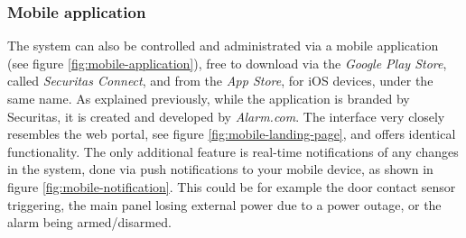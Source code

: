\subsubsection{Mobile application}
The system can also be controlled and administrated via a mobile application (see figure \ref{fig:mobile-application}), free to download via the \textit{Google Play Store}, called \textit{Securitas Connect}, and from the \textit{App Store}, for iOS devices, under the same name. As explained previously, while the application is branded by Securitas, it is created and developed by \textit{Alarm.com}. The interface very closely resembles the web portal, see figure \ref{fig:mobile-landing-page}, and offers identical functionality. The only additional feature is real-time notifications of any changes in the system, done via push notifications to your mobile device, as shown in figure \ref{fig:mobile-notification}. This could be for example the door contact sensor triggering, the main panel losing external power due to a power outage, or the alarm being armed/disarmed.
